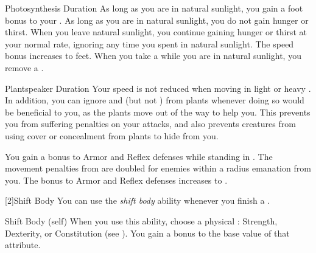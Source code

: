 {            \begin{durationability}{Photosynthesis}
                Duration
                \rankline
                As long as you are in natural sunlight, you gain a  foot bonus to your .
                \rankline
                 As long as you are in natural sunlight, you do not gain hunger or thirst.
                When you leave natural sunlight, you continue gaining hunger or thirst at your normal rate, ignoring any time you spent in natural sunlight.
                 The speed bonus increases to  feet.
                 When you take a  while you are in natural sunlight, you remove a .
            \end{durationability}

            \begin{durationability}{Plantspeaker}
                Duration
                \rankline
                Your speed is not reduced when moving in light or heavy .
                In addition, you can ignore  and  (but not ) from plants whenever doing so would be beneficial to you, as the plants move out of the way to help you.
                This prevents you from suffering penalties on your attacks, and also prevents creatures from using cover or concealment from plants to hide from you.

                \rankline
                 You gain a  bonus to Armor and Reflex defenses while standing in .
                 The movement penalties from  are doubled for enemies within a \areahuge radius emanation from you.
                 The bonus to Armor and Reflex defenses increases to .
            \end{durationability}
        }

        [2]{Shift Body} You can use the \textit{shift body} ability whenever you finish a .
        \begin{attuneability}{Shift Body}
             (self)
            \rankline
            When you use this ability, choose a physical : Strength, Dexterity, or Constitution (see ).
            You gain a  bonus to the base value of that attribute.
        \end{attuneability}

